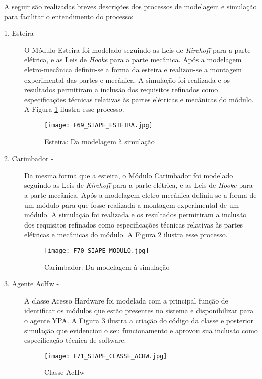  	A seguir são realizadas breves descrições dos processos de modelagem e simulação para facilitar o entendimento do processo:\par 
  
 	\begin{description}
 	\item [1. Esteira -] 	
 	 O Módulo Esteira foi modelado seguindo as Leis de \textit{Kirchoff} para a parte elétrica, e as Leis de \textit{Hooke} para a parte mecânica. Após a modelagem eletro-mecânica definiu-se a forma da esteira e realizou-se a montagem experimental das partes e  mecânica. A simulação foi realizada e os resultados permitiram a inclusão dos requisitos refinados como especificações técnicas relativas às partes elétricas e mecânicas do módulo. A Figura \ref{F69} ilustra esse processo.
 	 \begin{figure}[!h]
 	 	\centering
 	 	\texttt{[image: F69\_SIAPE\_ESTEIRA.jpg]} 
 	 	\caption{Esteira:  Da modelagem à simulação}
 	 	\label{F69}
 	 \end{figure}
 	 
 	\item[2. Carimbador -]  
 	Da mesma forma que a esteira,  o Módulo Carimbador foi modelado seguindo as Leis de \textit{Kirchoff} para a parte elétrica, e as Leis de \textit{Hooke} para a parte mecânica. Após a modelagem eletro-mecânica definiu-se a forma de um módulo para que fosse realizada a montagem experimental de um módulo. A simulação foi realizada e os resultados permitiram a inclusão dos requisitos refinados como especificações técnicas relativas às partes elétricas e mecânicas do módulo. A Figura \ref{F70} ilustra esse processo.	
 	 \begin{figure}[!h]
 	 	\centering
 	 	\texttt{[image: F70\_SIAPE\_MODULO.jpg]} 
 	 	\caption{Carimbador: Da modelagem à simulação}
 	 	\label{F70}
 	 \end{figure}
 	 
 	  \item[3. Agente AcHw - ] 
 	  A classe Acesso Hardware foi modelada com a principal função de identificar os módulos que estão presentes no  sistema e disponibilizar para o agente YPA. A Figura \ref{F71} ilustra a criação do código da classe e posterior simulação que evidenciou o seu funcionamento e aprovou sua inclusão como especificação técnica de software.  
 	  \begin{figure}[h]
 	  	\centering
 	  	\texttt{[image: F71\_SIAPE\_CLASSE\_ACHW.jpg]} 
 	  	\caption{Classe AcHw}
 	  	\label{F71}
 	  \end{figure}
 	  

\end{description}
